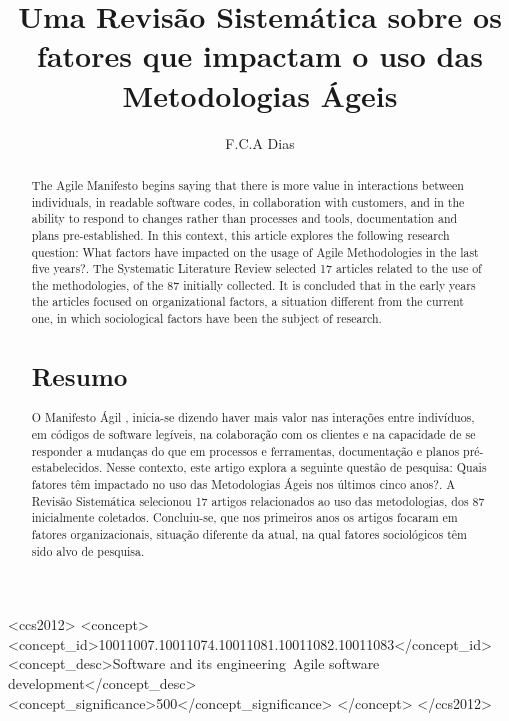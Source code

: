 \documentclass[sigconf]{acmart}
\begin{document}
\title{Uma Revisão Sistemática sobre os fatores que impactam o uso das Metodologias Ágeis}  
\author{F.C.A Dias}

\begin{abstract}
\noindent The Agile Manifesto \cite{Beck2001} begins saying that there is more value in interactions between individuals, in readable software codes, in collaboration with customers, and in the ability to respond to changes rather than processes and tools, documentation and plans pre-established. In this context, this article explores the following research question: What factors have impacted on the usage of Agile Methodologies in the last five years?. The Systematic Literature Review selected 17 articles related to the use of the methodologies, of the 87 initially collected. It is concluded that in the early years the articles focused on organizational factors, a situation different from the current one, in which sociological factors have been the subject of research.

\section*{Resumo}
\noindent O Manifesto Ágil \cite{Beck2001}, inicia-se dizendo haver mais valor nas interações entre indivíduos, em códigos de software legíveis, na colaboração com os clientes e na capacidade de se responder a mudanças do que em processos e ferramentas, documentação e planos pré-estabelecidos. Nesse contexto, este artigo explora a seguinte questão de pesquisa: Quais fatores têm impactado no uso das Metodologias Ágeis nos últimos cinco anos?. A Revisão Sistemática selecionou 17 artigos relacionados ao uso das metodologias, dos 87 inicialmente coletados. Concluiu-se, que nos primeiros anos os artigos focaram em fatores organizacionais, situação diferente da atual, na qual fatores sociológicos têm sido alvo de pesquisa.
\newline
\end{abstract}

\begin{CCSXML}
<ccs2012>
<concept>
<concept_id>10011007.10011074.10011081.10011082.10011083</concept_id>
<concept_desc>Software and its engineering~Agile software development</concept_desc>
<concept_significance>500</concept_significance>
</concept>
</ccs2012>
\end{CCSXML}



\maketitle




 
\end{document}

